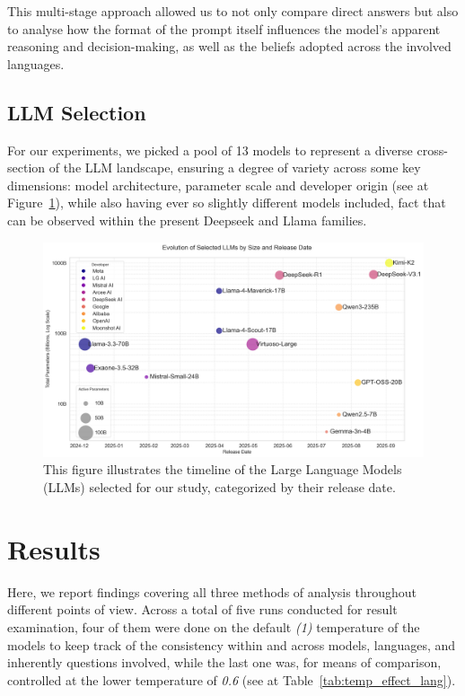 \documentclass[11pt]{article}
\begin{document}
This multi-stage approach allowed us to not only compare direct answers but also to analyse how the format of the prompt itself influences the model's apparent reasoning and decision-making, as well as the beliefs adopted across the involved languages.

\subsection{LLM Selection}
For our experiments, we picked a pool of 13 models to represent a diverse cross-section of the LLM landscape, ensuring a degree of variety across some key dimensions: model architecture, parameter scale and developer origin (see at Figure~\ref{fig:model_timeline}), while also having ever so slightly different models included, fact that can be observed within the present Deepseek \cite{deepseekai2025} and Llama families.
\begin{figure}[htbp]
    \centering
    \includegraphics[width=\textwidth]{model_timeline_plot.png}
    \caption{This figure illustrates the timeline of the Large Language Models (LLMs) selected for our study, categorized by their release date.}
    \label{fig:model_timeline}
\end{figure}


\section{Results}
Here, we report findings covering all three methods of analysis throughout different points of view. Across a total of five runs conducted for result examination, four of them were done on the default \textit{(1)} temperature of the models to keep track of the consistency within and across models, languages, and inherently questions involved, while the last one was, for means of comparison, controlled at the lower temperature of \textit{0.6} (see at Table~\ref{tab:temp_effect_lang}).
\end{document}
